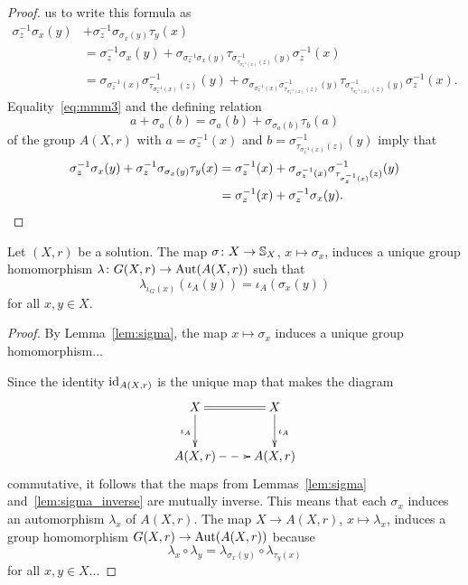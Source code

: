 \begin{proof}
us to write this formula as
\begin{align*}
\sigma^{-1}_z\sigma_x(y)&+\sigma^{-1}_z\sigma_{\sigma_x(y)}\tau_y(x)\\
&=\sigma^{-1}_z\sigma_x(y)+\sigma_{\sigma^{-1}_z\sigma_x(y)}\tau_{\sigma^{-1}_{\tau_{\sigma^{-1}_z(x)}(z)}(y)}\sigma^{-1}_z(x)\\
&=\sigma_{\sigma^{-1}_z(x)}\sigma^{-1}_{\tau_{\sigma^{-1}_z(x)}(z)}(y)+
\sigma_{\sigma_{\sigma^{-1}_z(x)}\sigma^{-1}_{\tau_{\sigma^{-1}_z(x)}(z)}(y)}\tau_{\sigma^{-1}_{\tau_{\sigma^{-1}_z(x)}(z)}(y)}\sigma^{-1}_z(x).
\end{align*}
Equality~\eqref{eq:mmm3} and 
the defining relation 
\[
a+\sigma_a(b)=\sigma_a(b)+\sigma_{\sigma_a(b)}\tau_b(a)
\]
of the group $A(X,r)$ with $a=\sigma^{-1}_z(x)$ and $b=\sigma^{-1}_{\tau_{\sigma^{-1}_z(x)}(z)}(y)$ 
imply that 
\begin{align*}
\sigma^{-1}_z\sigma_x(y)+\sigma^{-1}_z\sigma_{\sigma_x(y)}\tau_y(x)
&=\sigma^{-1}_z(x)+\sigma_{\sigma^{-1}_z(x)}\sigma^{-1}_{\tau_{\sigma^{-1}_z(x)}(z)}(y)\\
&=\sigma^{-1}_z(x)+\sigma_z^{-1}\sigma_x(y).\qedhere
\end{align*}
\end{proof}

\begin{proposition}
\label{pro:lambda}
Let $(X,r)$ be a solution. 
The map $\sigma\colon X\to\mathbb{S}_X$, $x\mapsto\sigma_x$, induces a unique group 
homomorphism $\lambda\colon G(X,r)\to\operatorname{Aut}(A(X,r))$ such that 
\[
\lambda_{\iota_G(x)}(\iota_A(y))=\iota_A(\sigma_x(y))
\]
for all $x,y\in X$. 
\end{proposition}

\begin{proof}
By Lemma~\ref{lem:sigma}, the map $x\mapsto\sigma_x$ induces a unique group homomorphism...

Since the identity $\operatorname{id}_{A(X,r)}$ is the unique map 
that makes the diagram
\[
\xymatrix{
 X
 \ar[d]_{\iota_A}
 \ar@{=}[r]
 & X
 \ar[d]^{\iota_A}
 \\
 A(X,r)
 \ar@{-->}[r]
 & A(X,r)
 }
\]
commutative, it follows that the maps from Lemmas~\ref{lem:sigma} 
and~\ref{lem:sigma_inverse} are mutually inverse. This means
that each $\sigma_x$ induces an automorphism $\lambda_x$ 
of $A(X,r)$. The map $X\to A(X,r)$, $x\mapsto\lambda_x$, 
induces a group homomorphism $G(X,r)\to\operatorname{Aut}(A(X,r))$ because
\[
\lambda_x\circ\lambda_y=\lambda_{\sigma_x(y)}\circ\lambda_{\tau_y(x)}
\]
for all $x,y\in X$... 
\end{proof}

